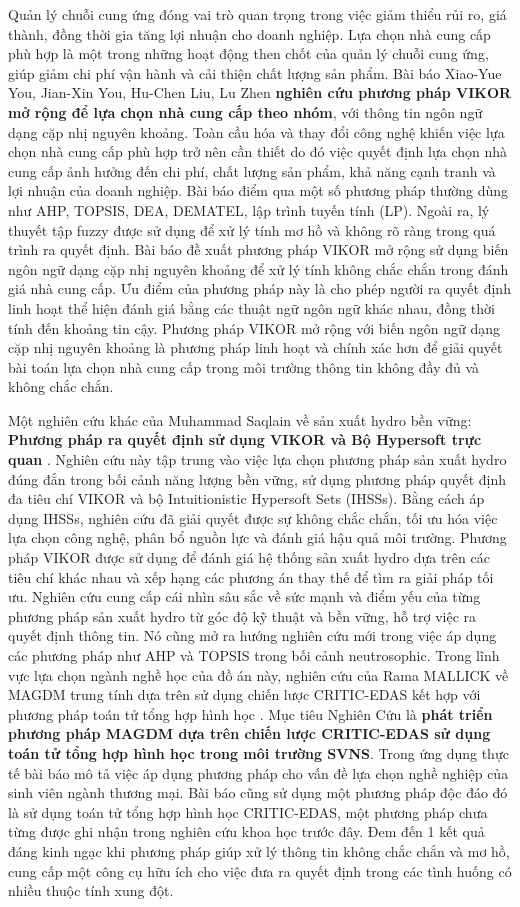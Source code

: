Quản lý chuỗi cung ứng đóng vai trò quan trọng trong việc giảm thiểu rủi ro, giá thành, đồng thời gia tăng lợi nhuận cho doanh nghiệp. Lựa chọn nhà cung cấp phù hợp là một trong những hoạt động then chốt của quản lý chuỗi cung ứng, giúp giảm chi phí vận hành và cải thiện chất lượng sản phẩm. Bài báo Xiao-Yue You, Jian-Xin You, Hu-Chen Liu, Lu Zhen \textbf{nghiên cứu phương pháp VIKOR mở rộng để lựa chọn nhà cung cấp theo nhóm}, với thông tin ngôn ngữ dạng cặp nhị nguyên khoảng. Toàn cầu hóa và thay đổi công nghệ khiến việc lựa chọn nhà cung cấp phù hợp trở nên cần thiết do đó  việc quyết định lựa chọn nhà cung cấp ảnh hưởng đến chi phí, chất lượng sản phẩm, khả năng cạnh tranh và lợi nhuận của doanh nghiệp. Bài báo điểm qua một số phương pháp thường dùng như AHP, TOPSIS, DEA, DEMATEL, lập trình tuyến tính (LP). Ngoài ra, lý thuyết tập fuzzy được sử dụng để xử lý tính mơ hồ và không rõ ràng trong quá trình ra quyết định. Bài báo đề xuất phương pháp VIKOR mở rộng sử dụng biến ngôn ngữ dạng cặp nhị nguyên khoảng để xử lý tính không chắc chắn trong đánh giá nhà cung cấp. Ưu điểm của phương pháp này là cho phép người ra quyết định linh hoạt thể hiện đánh giá bằng các thuật ngữ ngôn ngữ khác nhau, đồng thời tính đến khoảng tin cậy. Phương pháp VIKOR mở rộng với biến ngôn ngữ dạng cặp nhị nguyên khoảng là phương pháp linh hoạt và chính xác hơn để giải quyết bài toán lựa chọn nhà cung cấp trong môi trường thông tin không đầy đủ và không chắc chắn.

Một nghiên cứu khác của Muhammad Saqlain về sản xuất hydro bền vững: \textbf{Phương pháp ra quyết định sử dụng VIKOR và Bộ Hypersoft trực quan} \cite{muhammad}. Nghiên cứu này tập trung vào việc lựa chọn phương pháp sản xuất hydro đúng đắn trong bối cảnh năng lượng bền vững, sử dụng phương pháp quyết định đa tiêu chí VIKOR và bộ Intuitionistic Hypersoft Sets (IHSSs). Bằng cách áp dụng IHSSs, nghiên cứu đã giải quyết được sự không chắc chắn, tối ưu hóa việc lựa chọn công nghệ, phân bổ nguồn lực và đánh giá hậu quả môi trường. Phương pháp VIKOR được sử dụng để đánh giá hệ thống sản xuất hydro dựa trên các tiêu chí khác nhau và xếp hạng các phương án thay thế để tìm ra giải pháp tối ưu. Nghiên cứu cung cấp cái nhìn sâu sắc về sức mạnh và điểm yếu của từng phương pháp sản xuất hydro từ góc độ kỹ thuật và bền vững, hỗ trợ việc ra quyết định thông tin. Nó cũng mở ra hướng nghiên cứu mới trong việc áp dụng các phương pháp như AHP và TOPSIS trong bối cảnh neutrosophic.
Trong lĩnh vực lựa chọn ngành nghề học của đồ án này, nghiên cứu của Rama MALLICK về MAGDM trung tính dựa trên sử dụng chiến lược CRITIC-EDAS kết hợp với phương pháp toán tử tổng hợp hình học \cite{rama}. Mục tiêu Nghiên Cứu là \textbf{phát triển phương pháp MAGDM dựa trên chiến lược CRITIC-EDAS sử dụng toán tử tổng hợp hình học trong môi trường SVNS}. Trong ứng dụng thực tế bài báo mô tả việc áp dụng phương pháp cho vấn đề lựa chọn nghề nghiệp của sinh viên ngành thương mại. Bài báo cũng sử dụng một phương pháp độc đáo đó là sử dụng toán tử tổng hợp hình học CRITIC-EDAS, một phương pháp chưa từng được ghi nhận trong nghiên cứu khoa học trước đây. Đem đến 1 kết quả đáng kinh ngạc khi phương pháp giúp xử lý thông tin không chắc chắn và mơ hồ, cung cấp một công cụ hữu ích cho việc đưa ra quyết định trong các tình huống có nhiều thuộc tính xung đột.

